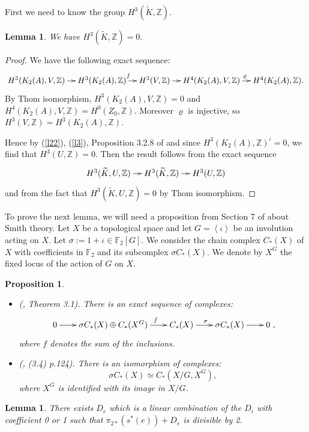 \documentclass{alggeom}
\renewcommand{\rho}{\varrho}
\newcommand{\Z}{\mathbb{Z}}
\theoremstyle{plain}
\newtheorem{lemme}[theorem]{Lemma}
\newtheorem{prop}[theorem]{Proposition}
\theoremstyle{definition}
\theoremstyle{remark}
\begin{document}
First we need to know the group $H^{3}(\widetilde{K},\Z)$.
\begin{lemme}\label{H3}
We have $H^{3}(\widetilde{K},\Z)=0.$
\end{lemme}
\begin{proof}
We have the following exact sequence: 
$$\xymatrix@C=10pt@R=0pt{H^{3}(K_2(A),V,\Z)\ar[r] &H^{3}(K_2(A),\Z)\ar[r]^{f} &H^{3}(V,\Z)\ar[r]& 
H^{4}(K_2(A),V,\Z)\ar[r]^{\rho} &H^{4}(K_2(A),\Z).}$$
By Thom isomorphism, $H^{3}(K_2(A),V,\Z)=0$ and $H^{4}(K_2(A),V,\Z)=H^{0}(Z_0,\Z)$.
Moreover $\rho$ is injective, so $H^{3}(V,\Z)=H^{3}(K_2(A),\Z)$. 

Hence by (\ref{l22}), (\ref{l3}), Proposition 3.2.8 of \cite{Lol} and since $H^{3}(K_2(A),\Z)^\iota=0$, we find that $H^{3}(U,\Z)=0$.
Then the result follows from the exact sequence
$$\xymatrix@C=10pt@R=0pt{H^{3}(\widetilde{K},U,\Z)\ar[r] &H^{3}(\widetilde{K},\Z)\ar[r] &H^{3}(U,\Z)}$$
and from the fact that $H^{3}(\widetilde{K},U,\Z)=0$ by Thom isomorphism.
\end{proof}
To prove the next lemma, 
we will need a proposition from Section 7 of \cite{BNS} about Smith theory. Let $X$ be a topological space and let $G=\left\langle \iota\right\rangle$ be an involution acting on $X$. 
Let $\sigma:=1+\iota\in \mathbb{F}_{2}[G]$. We consider the chain complex $C_{*}(X)$ of $X$ with coefficients in $\mathbb{F}_{2}$ and its subcomplex $\sigma C_{*}(X)$. We denote by $X^{G}$ the fixed locus of the action of $G$ on $X$. 
\begin{prop}\label{SmithProp}
\begin{itemize}
\item[(1)] (\cite{Bredon}, Theorem 3.1). There is an exact sequence of complexes:
$$\xymatrix@C=20pt{0\ar[r] &\sigma C_{*}(X)\oplus C_{*}(X^{G})\ar[r]^{\ \ \ \ \ \ f}&C_{*}(X) \ar[r]^{\sigma}&\sigma C_{*}(X) \ar[r]&0
},$$ where $f$ denotes the sum of the inclusions.
\item[(2)] (\cite{Bredon}, (3.4) p.124). There is an isomorphism of complexes:
$$\sigma C_{*}(X)\simeq C_{*}(X/G,X^{G}),$$
where $X^{G}$ is identified with its image in $X/G$.
\end{itemize}
\end{prop}
\begin{lemme}\label{exist}
There exists $D_e$ which is a linear combination of the $D_i$ with coefficient 0 or 1 such that $\pi_{2*}(s^{*}(e))+D_e$ is divisible by 2.
\end{lemme}
\end{document}
